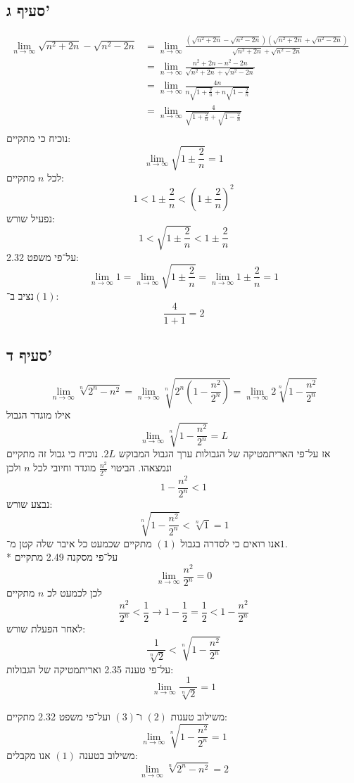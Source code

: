 \documentclass[a4paper]{article}
\begin{document}
\subsection{סעיף ג'}
\begin{align*}
	\lim_{n \to \infty} \sqrt{n^2 + 2n} - \sqrt{n^2 - 2n}
	& = \lim_{n \to \infty} \frac
		{(\sqrt{n^2 + 2n} - \sqrt{n^2 - 2n})
		(\sqrt{n^2 + 2n} + \sqrt{n^2 - 2n})}
		{\sqrt{n^2 + 2n} + \sqrt{n^2 - 2n}} \\
	& = \lim_{n \to \infty} \frac
		{n^2 + 2n - n^2 - 2n}
		{\sqrt{n^2 + 2n} + \sqrt{n^2 - 2n}} \\
	& = \lim_{n \to \infty} \frac
		{4n}
		{n \sqrt{1 + \frac{2}{n}} + n \sqrt{1 - \frac{2}{n}}} \\
	& = \lim_{n \to \infty} \frac
		{4}
		{\sqrt{1 + \frac{2}{n}} + \sqrt{1 - \frac{2}{n}}}
	& \tag{1} \\
\end{align*}
נוכיח כי מתקיים:
\[
	\lim_{n \to \infty} \sqrt{1 \pm \frac{2}{n}} = 1
\]
לכל $n$ מתקיים:
\[
	1 < 1 \pm \frac{2}{n} < {(1 \pm \frac{2}{n})}^2
\]
נפעיל שורש:
\[
	1 < \sqrt{1 \pm \frac{2}{n}} < 1 \pm \frac{2}{n}
\]
על־פי משפט 2.32:
\[
	\lim_{n \to \infty} 1
	= \lim_{n \to \infty} \sqrt{1 \pm \frac{2}{n}} 
	= \lim_{n \to \infty} 1 \pm \frac{2}{n} = 1
\]
נציב ב־$(1)$:
\[
	\frac {4} {1 + 1} = 2
\]

\subsection{סעיף ד'}
\[
	\lim_{n \to \infty} \sqrt[n]{ 2^n - n^2 }
	= \lim_{n \to \infty} \sqrt[n]{ 2^n (1 - \frac{n^2}{2^n}) }
	= \lim_{n \to \infty} 2 \sqrt[n]{ 1 - \frac{n^2}{2^n} }
\]
אילו מוגדר הגבול
\[
	\lim_{n \to \infty} \sqrt[n]{ 1 - \frac{n^2}{2^n} } = L \tag{1}
\]
אז על־פי האריתמטיקה של הגבולות ערך הגבול המבוקש $2L$.
נוכיח כי גבול זה מתקיים ונמצאהו.
הביטוי $\frac{n^2}{2^n}$ מוגדר וחיובי לכל $n$ ולכן
\[
	1 - \frac{n^2}{2^n} < 1
\]
נבצע שורש:
\[
	\sqrt[n]{1 - \frac{n^2}{2^n}} < \sqrt[n]{1} = 1 \tag{2}
\]
אנו רואים כי לסדרה בגבול $(1)$ מתקיים שכמעט כל איבר שלה קטן מ־$1$. \\*
על־פי מסקנה 2.49 מתקיים
\[
	\lim_{n \to \infty} \frac{n^2}{2^n} = 0
\]
לכן לכמעט לכ $n$ מתקיים
\[
	\frac{n^2}{2^n} < \frac{1}{2}
	\rightarrow
	1 - \frac{1}{2} = \frac{1}{2} < 1 - \frac{n^2}{2^n}
\]
לאחר הפעלת שורש:
\[
	\frac{1}{\sqrt[n]{2}} < \sqrt[n]{1 - \frac{n^2}{2^n}}
\]
על־פי טענה 2.35 ואריתמטיקה של הגבולות:
\[
	\lim_{n \to \infty} \frac{1}{\sqrt[n]{2}} = 1 \tag{3}
\]

משילוב טענות $(2)$ ו־$(3)$ ועל־פי משפט 2.32 מתקיים:
\[
	\lim_{n \to \infty} \sqrt[n]{1 - \frac{n^2}{2^n}} = 1
\]
משילוב בטענה $(1)$ אנו מקבלים:
\[
	\lim_{n \to \infty} \sqrt[n]{ 2^n - n^2 } = 2
\]
\end{document}
